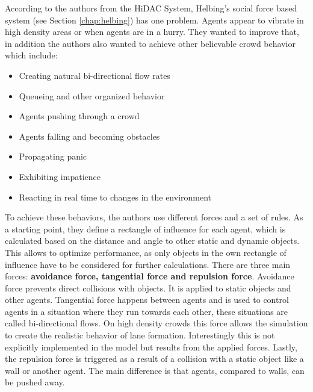 \documentclass{acmsiggraph}               %
\begin{document}
According to the authors from the HiDAC System, Helbing's social force based system (see Section \ref{chap:helbing}) has one problem. Agents appear to vibrate in high density areas or when agents are in a hurry. They wanted to improve that, in addition the authors also wanted to achieve other believable crowd behavior which include: 
\begin{itemize}
    \item Creating natural bi-directional flow rates
    \item Queueing and other organized behavior
    \item Agents pushing through a crowd
    \item Agents falling and becoming obstacles 
    \item Propagating panic
    \item Exhibiting impatience
    \item Reacting in real time to changes in the environment
\end{itemize}
To achieve these behaviors, the authors use different forces and a set of rules.
As a starting point, they define a rectangle of influence for each agent, which is calculated based on the distance and angle to other static and dynamic objects. This allows to optimize performance, as only objects in the own rectangle of influence have to be considered for further calculations. 
There are three main forces: \textbf{avoidance force, tangential force and repulsion force}. Avoidance force prevents direct collisions with objects. It is applied to static objects and other agents. Tangential force happens between agents and is used to control agents in a situation where they run towards each other, these situations are called bi-directional flows. On high density crowds this force allows the simulation to create the realistic behavior of lane formation. Interestingly this is not explicitly implemented in the model but results from the applied forces. Lastly, the repulsion force is triggered as a result of a collision with a static object like a wall or another agent. The main difference is that agents, compared to walls, can be pushed away. 
\end{document}
